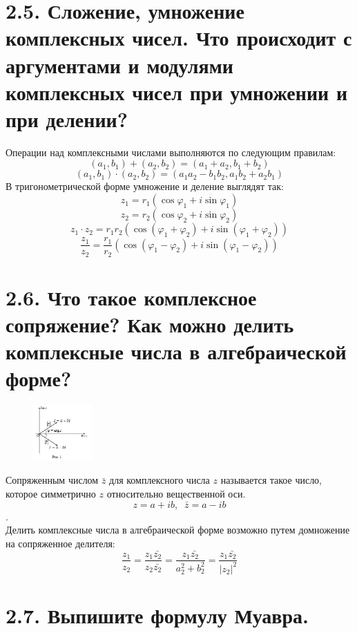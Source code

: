 \documentclass{article}
\begin{document}
\section*{\LARGE 2.5. Сложение, умножение комплексных чисел. Что происходит с аргументами и модулями комплексных чисел при умножении и при делении? }

Операции над комплексными числами выполняются по следующим правилам:
$$ (a_1, b_1) + (a_2, b_2) = (a_1 + a_2, b_1 + b_2) $$
$$ (a_1, b_1) \cdot (a_2, b_2) = (a_1a_2 - b_1b_2, a_1b_2 + a_2b_1) $$
В тригонометрической форме умножение и деление выглядят так:
$$ z_1 = r_1(\cos{\varphi_1} + i\sin{\varphi_1}) $$
$$ z_2 = r_2(\cos{\varphi_2} + i\sin{\varphi_2}) $$
$$ z_1 \cdot z_2 = r_1r_2(\cos{(\varphi_1 + \varphi_2)} + i\sin{(\varphi_1 + \varphi_2)}) $$
$$ \frac{z_1}{z_2} = \frac{r_1}{r_2}(\cos{(\varphi_1 - \varphi_2)} + i\sin{(\varphi_1 - \varphi_2)}) $$

\section*{\LARGE 2.6. Что такое комплексное сопряжение? Как можно делить комплексные числа в алгебраической форме? }

\begin{figure}
    \centering
    \includegraphics[width=0.2\textwidth]{images/sopr_complex.png}
\end{figure}
Сопряженным числом $\bar{z}$ для комплексного числа $z$ называется такое число, которое симметрично $z$ относительно вещественной оси.
$$z = a + ib, \;\; \bar{z} = a - ib$$. 
$$ $$ 
\newline Делить комплексные числа в алгебраической форме возможно путем домножение на сопряженное делителя:
$$
\frac{z_1}{z_2} = \frac{z_1 \bar{z_2}}{z_2 \bar{z_2}} = \frac{z_1 \bar{z_2}}{a_2^2 + b_2^2} = \frac{z_1 \bar{z_2}}{|z_2|^2}
$$

\section*{\LARGE 2.7. Выпишите формулу Муавра.  }
\end{document}
